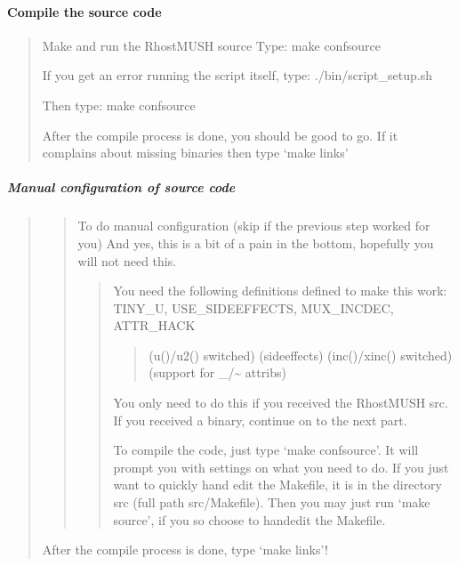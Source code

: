 \documentclass[letterpaper,10pt,english]{sphinxmanual}
\begin{document}
\paragraph{Compile the source code}
\label{\detokenize{installation:compile-the-source-code}}\begin{quote}

\sphinxAtStartPar
Make and run the RhostMUSH source
Type:  make confsource

\sphinxAtStartPar
If you get an error running the script itself,
type: ./bin/script\_setup.sh

\sphinxAtStartPar
Then type: make confsource

\sphinxAtStartPar
After the compile process is done, you should be good to go.
If it complains about missing binaries then type ‘make links’
\end{quote}


\subparagraph{Manual configuration of source code}
\label{\detokenize{installation:manual-configuration-of-source-code}}\begin{quote}
\begin{quote}

\sphinxAtStartPar
To do manual configuration (skip if the previous step worked for you)
And yes, this is a bit of a pain in the bottom, hopefully you
will not need this.
\begin{quote}

\sphinxAtStartPar
You need the following definitions defined to make this
work:  TINY\_U, USE\_SIDEEFFECTS, MUX\_INCDEC, ATTR\_HACK
\begin{quote}

\sphinxAtStartPar
(u()/u2() switched)
(sideeffects)
(inc()/xinc() switched)
(support for \_/\textasciitilde{} attribs)
\end{quote}

\sphinxAtStartPar
You only need to do this if you received the RhostMUSH src.
If you received a binary, continue on to the next part.

\sphinxAtStartPar
To compile the code, just type ‘make confsource’.  It will
prompt you with settings on what you need to do.  If you
just want to quickly hand edit the Makefile, it is in the
directory src (full path src/Makefile).  Then you may just
run ‘make source’, if you so choose to hand\sphinxhyphen{}edit the Makefile.
\end{quote}
\end{quote}

\sphinxAtStartPar
After the compile process is done, type ‘make links’!
\begin{quote}
\end{quote}
\end{quote}
\end{document}
